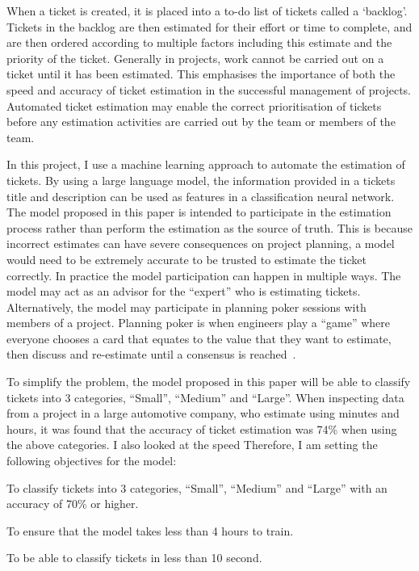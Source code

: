 \documentclass{UoYCSproject}
\let\oldenumerate\enumerate
\let\endoldenumerate\endenumerate
\renewenvironment{enumerate}{\oldenumerate\setlength{\itemsep}{0pt}\setlength{\parskip}{0pt}\setlength{\parsep}{0pt}}{\endoldenumerate}
\begin{document}
    When a ticket is created, it is placed into a to-do list of tickets called a `backlog'.
    Tickets in the backlog are then estimated for their effort or time to complete, and are then ordered according to multiple factors including this estimate and the priority of the ticket.
    Generally in projects, work cannot be carried out on a ticket until it has been estimated.
    This emphasises the importance of both the speed and accuracy of ticket estimation in the successful management of projects.
    Automated ticket estimation may enable the correct prioritisation of tickets before any estimation activities are carried out by the team or members of the team. \par

    In this project, I use a machine learning approach to automate the estimation of tickets.
    By using a large language model, the information provided in a tickets title and description can be used as features in a classification neural network.
    The model proposed in this paper is intended to participate in the estimation process rather than perform the estimation as the source of truth.
    This is because incorrect estimates can have severe consequences on project planning, a model would need to be extremely accurate to be trusted to estimate the ticket correctly.
    In practice the model participation can happen in multiple ways.
    The model may act as an advisor for the “expert” who is estimating tickets.
    Alternatively, the model may participate in planning poker sessions with members of a project.
    Planning poker is when engineers play a “game” where everyone chooses a card that equates to the value that they want to estimate, then discuss and re-estimate until a consensus is reached~\cite{1667560}. \par

    To simplify the problem, the model proposed in this paper will be able to classify tickets into 3 categories, “Small”, “Medium” and “Large”.
    When inspecting data from a project in a large automotive company, who estimate using minutes and hours, it was found that the accuracy of ticket estimation was 74\% when using the above categories. I also looked at the speed
    Therefore, I am setting the following objectives for the model:
    \begin{enumerate}
        \item To classify tickets into 3 categories, “Small”, “Medium” and “Large” with an accuracy of 70\% or higher.
        \item To ensure that the model takes less than 4 hours to train.
        \item To be able to classify tickets in less than 10 second.
    \end{enumerate}
\end{document}
